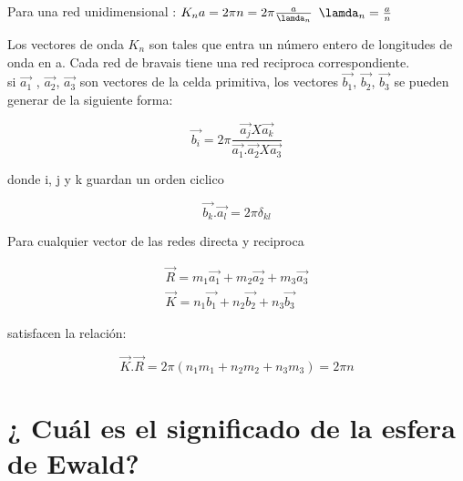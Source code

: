 \documentclass[12pt,a4paper]{article}
\begin{document}
Para una red unidimensional : $ K_{n}a = 2\pi n = 2\pi \frac{a}{\lamda_{n}}$ \longrightarrow $\lamda_{n} = \frac{a}{n}$

Los vectores de onda $K_{n}$ son tales que entra un número entero de longitudes de onda en a. Cada red de bravais tiene una red reciproca correspondiente. \\

si $\overrightarrow{a_{1}}$ , $\overrightarrow{a_{2}}$, $\overrightarrow{a_{3}}$ son vectores de la celda primitiva, los vectores $\overrightarrow{b_{1}}$, $\overrightarrow{b_{2}}$, $\overrightarrow{b_{3}}$ se pueden generar de la siguiente forma:

\begin{equation*}
    \overrightarrow{b_{i}} =2 \pi \frac{ \overrightarrow{a_{j}}X \overrightarrow{a_{k}}}{ \overrightarrow{a_{1}}. \overrightarrow{a_{2}} X \overrightarrow{a_{3}}}
\end{equation*}

 donde  i, j y k guardan un orden ciclico
 
 \begin{equation*}
     \overrightarrow{b_{k}} . \overrightarrow{a_{l}} = 2\pi \delta_{kl}
 \end{equation*}
 
 Para cualquier vector de las redes directa y reciproca 


\begin{align*}
    \overrightarrow{R} = m_{1}\overrightarrow{a_{1}}+ m_{2}\overrightarrow{a_{2}}+ m_{3}\overrightarrow{a_{3}}\\
    \overrightarrow{K} = n_{1}\overrightarrow{b_{1}} + n_{2}\overrightarrow{b_{2}}+ n_{3}\overrightarrow{b_{3}}
\end{align*} 

satisfacen la relación:

\begin{equation*}
    \overrightarrow{K} . \overrightarrow{R} = 2\pi(n_{1}m_{1}+n_{2}m_{2}+n_{3}m_{3}) =  2\pi n
\end{equation*}
 
 
 
 
 
 
 
 
 
 
 
\section{¿ Cuál es el significado de la esfera de Ewald?}\par
\end{document}

